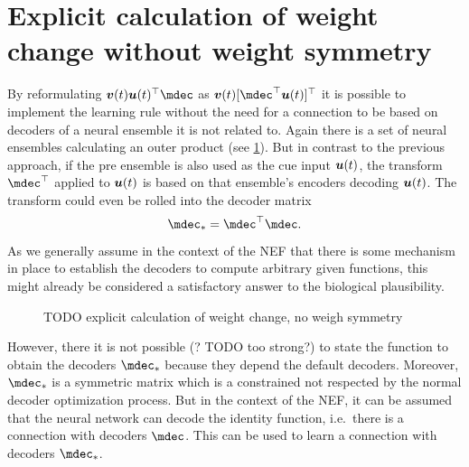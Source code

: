 \section{Explicit calculation of weight change without weight symmetry}
By reformulating $\vc v(t) \vc u(t)\Tr \mdec$ as $\vc v(t)[\mdec\Tr \vc u(t)]\Tr$ it is possible to implement the learning rule without the need for a connection to be based on decoders of a neural ensemble it is not related to.
Again there is a set of neural ensembles calculating an outer product (see \cref{fig:aml-explicit-no-sym}).
But in contrast to the previous approach, if the pre ensemble is also used as the cue input $\bm{u}(t)$, the transform $\mdec\Tr$ applied to $\bm{u}(t)$ is based on that ensemble's encoders decoding $\bm{u}(t)$.
The transform could even be rolled into the decoder matrix
\begin{equation}
    \mdec_{*} = \mdec\Tr \mdec \text{.}
\end{equation}
As we generally assume in the context of the NEF that there is some mechanism in place to establish the decoders to compute arbitrary given functions, this might already be considered a satisfactory answer to the biological plausibility.
\begin{figure}
    \centering
    \caption{TODO explicit calculation of weight change, no weigh symmetry}\label{fig:aml-explicit-no-sym}
\end{figure}

However, there it is not possible (? TODO too strong?) to state the function to obtain the decoders $\mdec_*$ because they depend the default decoders.
Moreover, $\mdec_*$ is a symmetric matrix which is a constrained not respected by the normal decoder optimization process.
But in the context of the NEF, it can be assumed that the neural network can decode the identity function, i.e.\ there is a connection with decoders $\mdec$.
This can be used to learn a connection with decoders $\mdec_*$.


